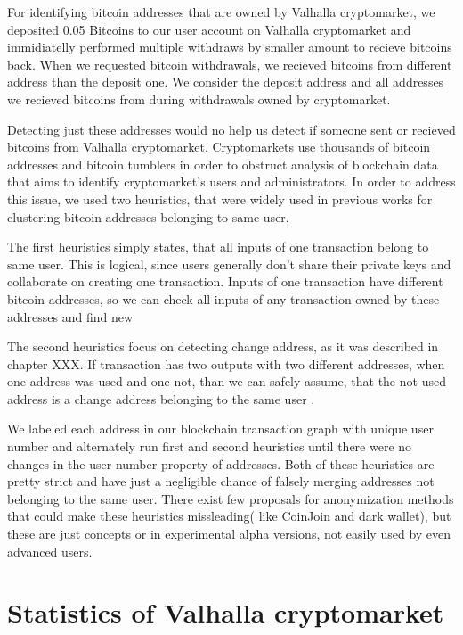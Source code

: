 \documentclass[
  digital, %
  table,   %
  lof,     %
  lot,     %
  oneside
]{fithesis3}
\begin{document}
For identifying bitcoin addresses that are owned by Valhalla cryptomarket, we 
deposited 0.05 Bitcoins to our user account on Valhalla cryptomarket and immidiatelly
performed multiple withdraws by smaller amount to recieve bitcoins back.
When we requested bitcoin withdrawals, we recieved bitcoins from different address
than the deposit one. We consider the deposit address and all addresses we recieved
bitcoins from during withdrawals owned by cryptomarket.

Detecting just these addresses would no help us detect
if someone sent or recieved bitcoins from Valhalla cryptomarket.
Cryptomarkets use thousands of bitcoin addresses and
bitcoin tumblers in order to obstruct analysis of blockchain data
that aims to identify cryptomarket's users and administrators.
In order to address this issue, we used two heuristics, that were widely used
in previous works \parencite{androulaki2013evaluating}\parencite{reid2013analysis}
for clustering bitcoin addresses belonging to same user.

The first heuristics simply states, that all inputs of one transaction belong to same user. This is logical,
since users generally don't share their private keys and collaborate on creating one transaction.
Inputs of one transaction have different bitcoin addresses, so we can check all inputs of any transaction
owned by these addresses and find new 

The second heuristics focus on detecting change address, as it was described in chapter XXX.
If transaction has two outputs with two different addresses, when one address was used and one not,
than we can safely assume, that the not used address is a change address belonging to the same user \parencite{androulaki2013evaluating}.

We labeled each address in our blockchain transaction graph with unique user number
and alternately run first and second heuristics until there were no changes in the user number property of addresses.
Both of these heuristics are pretty strict and have just a negligible chance of falsely merging
addresses not belonging to the same user\parencite{androulaki2013evaluating}.
There exist few proposals for anonymization methods that could make
these heuristics missleading( like CoinJoin and dark wallet), but
these are just concepts or in experimental alpha versions, not easily
used by even advanced users.

\chapter{Statistics of Valhalla cryptomarket}
\end{document}
